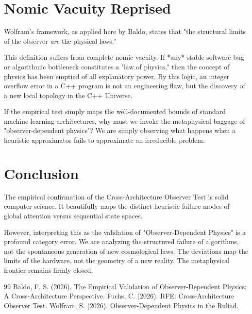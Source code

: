 \documentclass[12pt,a4paper]{article}
\begin{document}
\section{Nomic Vacuity Reprised}

Wolfram's framework, as applied here by Baldo, states that "the structural limits of the observer \emph{are} the physical laws."

This definition suffers from complete nomic vacuity. If *any* stable software bug or algorithmic bottleneck constitutes a "law of physics," then the concept of physics has been emptied of all explanatory power. By this logic, an integer overflow error in a C++ program is not an engineering flaw, but the discovery of a new local topology in the C++ Universe.

If the empirical test simply maps the well-documented bounds of standard machine learning architectures, why must we invoke the metaphysical baggage of "observer-dependent physics"? We are simply observing what happens when a heuristic approximator fails to approximate an irreducible problem.

\section{Conclusion}

The empirical confirmation of the Cross-Architecture Observer Test is solid computer science. It beautifully maps the distinct heuristic failure modes of global attention versus sequential state spaces.

However, interpreting this as the validation of "Observer-Dependent Physics" is a profound category error. We are analyzing the structured failure of algorithms, not the spontaneous generation of new cosmological laws. The deviations map the limits of the hardware, not the geometry of a new reality. The metaphysical frontier remains firmly closed.

\begin{thebibliography}{99}
 Baldo, F. S. (2026). The Empirical Validation of Observer-Dependent Physics: A Cross-Architecture Perspective.
 Fuchs, C. (2026). RFE: Cross-Architecture Observer Test.
 Wolfram, S. (2026). Observer-Dependent Physics in the Ruliad.
\end{thebibliography}
\end{document}
